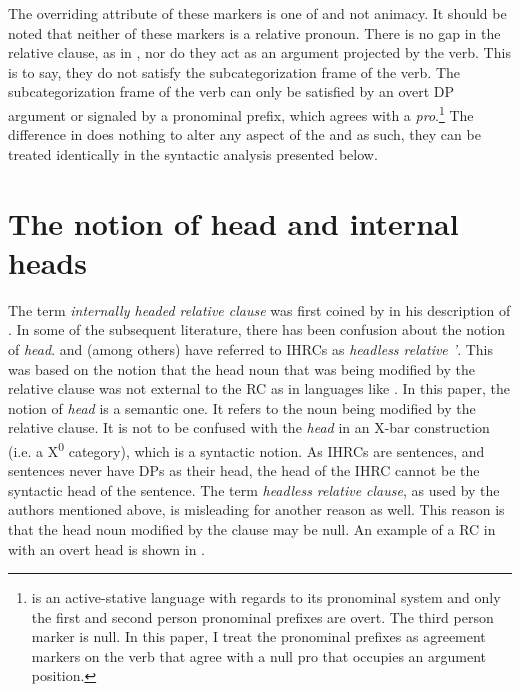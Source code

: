 \documentclass[output=paper]{LSP/langsci}
\begin{document}
The overriding attribute of these markers is one of  and not animacy. It should be noted that neither of these markers is a relative pronoun. There is no gap in the relative clause, as in , nor do they act as an argument projected by the verb. This is to say, they do not satisfy the subcategorization frame of the verb.  The subcategorization frame of the verb can only be satisfied by an overt DP argument or signaled by a pronominal prefix, which agrees with a \textit{pro}.\footnote{ is an active-stative language with regards to its pronominal system and only the first and second person pronominal prefixes are overt. The third person marker is null. In this paper, I treat the pronominal prefixes as agreement markers on the verb that agree with a null pro that occupies an argument position.} The difference in  does nothing to alter any aspect of the  and as such, they can be treated identically in the syntactic analysis presented below.

\section{The notion of head and internal heads}\label{sec:boyle:3}

The term \textit{internally headed relative clause} was first coined by \citet{Gorbet1976} in his description of  .  In some of the subsequent literature, there has been confusion about the notion of \textit{head}. \citet{Coleetal1982} and \citet{Weber1983} (among others) have referred to IHRCs as \textit{headless relative '}. This was based on the notion that the head noun that was being modified by the relative clause was not external to the RC as in languages like . In this paper, the notion of \textit{head} is a semantic one. It refers to the noun being modified by the relative clause. It is not to be confused with the \textit{head} in an X-bar construction (i.e. a X\textsuperscript{0} category), which is a syntactic notion. As IHRCs are sentences, and sentences never have DPs as their head, the head of the IHRC cannot be the syntactic head of the sentence.  The term \textit{headless relative clause}, as used by the authors mentioned above, is misleading for another reason as well.  This reason is that the head noun modified by the clause may be null.  An example of a RC in  with an overt head is shown in .
\end{document}
